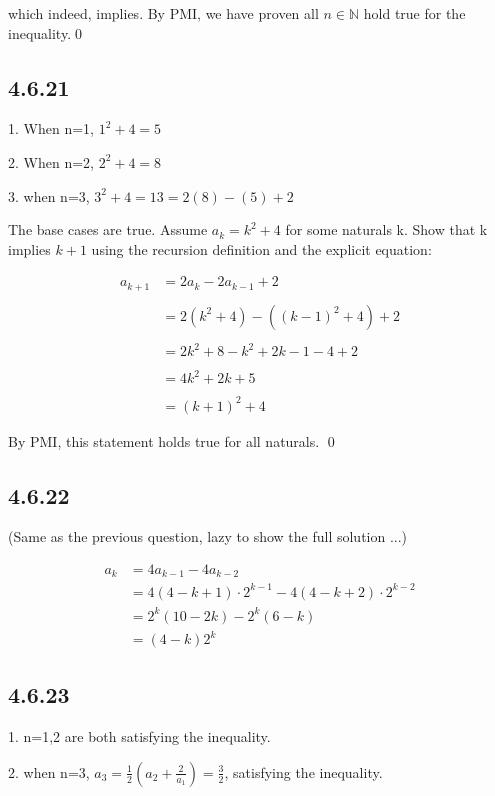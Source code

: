 \documentclass{article}
\begin{document}
which indeed, implies. By PMI, we have proven all $n\in\mathbb{N}$ hold true for the inequality.\qed

\subsection*{4.6.21}

1. When n=1, $1^2+4=5$ \checkmark

2. When n=2, $2^2+4=8$ \checkmark

3. when n=3, $3^2+4=13=2(8)-(5)+2$ \checkmark

The base cases are true. Assume $a_k=k^2+4$ for some naturals k. Show that k implies $k+1$ using the recursion definition and the explicit equation:

$$\begin{aligned}a_{k+1}&=2a_k-2a_{k-1}+2\\\\&=2\left(k^2+4\right)-\left(\left(k-1\right)^2+4\right)+2\\\\&=2k^2+8-k^2+2k-1-4+2\\\\&=4k^2+2k+5\\\\&=\left(k+1\right)^2+4\end{aligned}$$

By PMI, this statement holds true for all naturals. \qed

\subsection*{4.6.22}

(Same as the previous question, lazy to show the full solution ...)

$$\begin{aligned}a_k&=4a_{k-1}-4a_{k-2}\\&=4\left(4-k+1\right)\cdot2^{k-1}-4\left(4-k+2\right)\cdot2^{k-2}\\&=2^{k}(10-2k)-2^{k}(6-k)\\&=\left(4-k\right)2^{k}\end{aligned}$$

\subsection*{4.6.23}

1. n=1,2 are both satisfying the inequality. 

2. when n=3, $a_3=\frac{1}{2}\left(a_{2}+\frac{2}{a_{1}}\right)=\frac{3}{2}$, satisfying the inequality.
\end{document}
